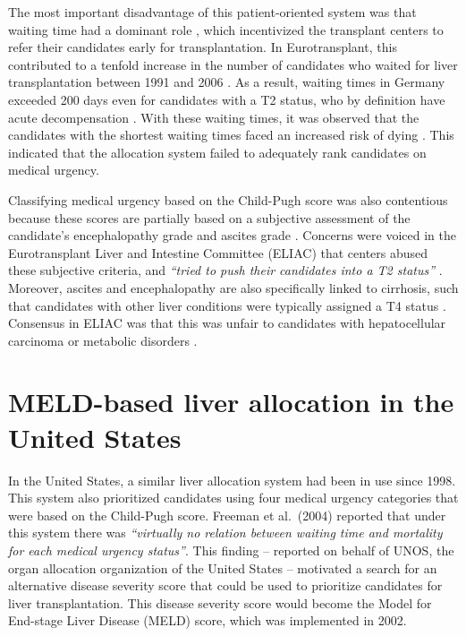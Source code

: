 \documentclass[11pt,twoside,]{book}
\begin{document}
The most important disadvantage of this patient-oriented system was that waiting
time had a dominant role \citep{Strassburg2004, Jung2008}, which incentivized the
transplant centers to refer their candidates early for transplantation. In Eurotransplant,
this contributed to a tenfold increase in the number of candidates who
waited for liver transplantation between 1991 and 2006 \citep{Jung2008}. As a result,
waiting times in Germany exceeded 200 days even for candidates with a T2 status,
who by definition have acute decompensation \citep{Strassburg2004}. With
these waiting times, it was observed that the candidates with the shortest
waiting times faced an increased risk of dying \citep{minutesELIACMeeting2002}. This
indicated that the allocation system failed to adequately rank candidates on
medical urgency.

Classifying medical urgency based on the Child-Pugh score was also contentious
because these scores are partially based on a subjective assessment of the candidate's
encephalopathy grade and ascites grade \citep{Jung2008, wiesnerModelEndstageLiver2003}.
Concerns were voiced in the Eurotransplant Liver and Intestine Committee (ELIAC)
that centers abused these subjective criteria, and \emph{``tried to push their candidates into
a T2 status''} \citep{minutesELIACMeeting2006}. Moreover, ascites and encephalopathy
are also specifically linked to cirrhosis, such that candidates with
other liver conditions were typically assigned a T4 status \citep{Strassburg2004}.
Consensus in ELIAC was that this was unfair to candidates with hepatocellular
carcinoma or metabolic disorders \citep{minutesELIACMeeting2001}.

\section{MELD-based liver allocation in the United States}\label{meld-based-liver-allocation-in-the-united-states}

In the United States, a similar liver allocation system had been in use since 1998.
This system also prioritized candidates using four medical urgency categories
that were based on the Child-Pugh score. Freeman et al.~(2004) reported that
under this system there was \emph{``virtually no relation between waiting time and
mortality for each medical urgency status''}. This finding -- reported on behalf
of UNOS, the organ allocation organization of the United States -- motivated a
search for an alternative disease severity score that could be used to prioritize
candidates for liver transplantation. This disease severity score would become
the Model for End-stage Liver Disease (MELD) score, which was implemented in 2002.
\end{document}
